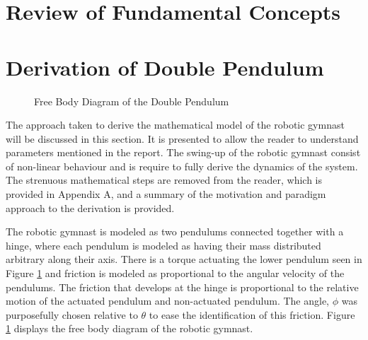 \documentclass[a4paper,12pt]{article}
\begin{document}
	\section{Review of Fundamental Concepts}
	
	\section{Derivation of Double Pendulum}
	\begin{figure}
		\centering
		
		\caption{Free Body Diagram of the Double Pendulum}
		\label{fig:doublePen}
	\end{figure}

	The approach taken to derive the mathematical model of the robotic gymnast will be discussed in this section. It is presented to allow the reader to understand parameters mentioned in the report. The swing-up of the robotic gymnast consist of non-linear behaviour and is require to fully derive the dynamics of the system. The strenuous mathematical steps are removed from the reader, which is provided in Appendix A, and a summary of the motivation and paradigm approach to the derivation is provided.

	The robotic gymnast is modeled as two pendulums connected together with a hinge, where each pendulum is modeled as having their mass distributed arbitrary along their axis. There is a torque actuating the lower pendulum seen in Figure \ref{fig:doublePen} and friction is modeled as proportional to the angular velocity of the pendulums. The friction that develops at the hinge is proportional to the relative motion of the actuated pendulum and non-actuated pendulum. The angle, $\phi$ was purposefully chosen relative to $\theta$ to ease the identification of this friction. Figure \ref{fig:doublePen} displays the free body diagram of the robotic gymnast.
	
\end{document}
